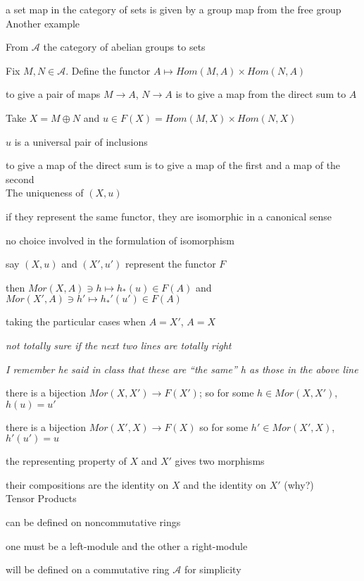 \documentclass[12pt]{article}
\begin{document}
\noindent
a set map in the category of sets is given by a group map from the free group\\

\noindent
Another example

From $\mathcal{A}$ the category of abelian groups to sets

Fix $M, N \in \mathcal{A}$.  Define the functor $A \mapsto Hom(M, A) \times Hom(N, A)$

to give a pair of maps $M \to A$, $N \to A$ is to give a map from the direct sum to $A$

Take $X = M \oplus N$ and $u \in F(X) = Hom(M, X) \times Hom(N, X)$

$u$ is a universal pair of inclusions

to give a map of the direct sum is to give a map of the first and a map of the second\\

\noindent
The uniqueness of $(X, u)$

if they represent the same functor, they are isomorphic in a canonical sense

no choice involved in the formulation of isomorphism

say $(X, u)$ and $(X', u')$ represent the functor $F$

then $Mor(X, A) \ni h \mapsto h_*(u) \in F(A)$ and $Mor(X', A) \ni h' \mapsto h_*'(u') \in F(A)$

taking the particular cases when $A = X'$, $A = X$

\textit{not totally sure if the next two lines are totally right}

\textit{I remember he said in class that these are ``the same'' h as those in the above line}

there is a bijection $Mor(X, X') \to F(X')$; so for some $h \in Mor(X, X')$, $h(u) = u'$

there is a bijection $Mor(X', X) \to F(X)$ so for some $h' \in Mor(X', X)$, $h'(u') = u$

the representing property of $X$ and $X'$ gives two morphisms

their compositions are the identity on $X$ and the identity on $X'$ (why?)\\

\noindent
Tensor Products

can be defined on noncommutative rings

one must be a left-module and the other a right-module

will be defined on a commutative ring $\mathcal{A}$ for simplicity
\end{document}
